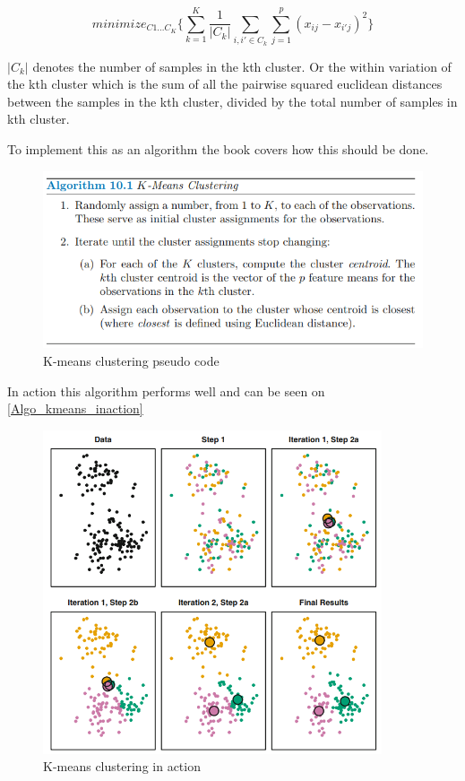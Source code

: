 \begin{equation} \label{transformed_linear_regression_eq}
minimize_{C1...C_{K}}\{\sum_{k=1}^{K}\dfrac{1}{\lvert C_{k} \rvert} \sum_{i,i'\in C_{k}}^{} \sum_{j=1}^{p}(x_{ij}-x_{i'j})^{2} \}
\end{equation}

$\lvert C_{k}\rvert$ denotes the number of samples in the kth cluster. Or the within variation of the kth cluster which is the sum of all the pairwise squared euclidean distances between the samples in the kth cluster, divided by the total number of samples in kth cluster.

To implement this as an algorithm the book \cite{book_2015} covers how this should be done. 

\begin{figure}[H]
	\centering
	\includegraphics[width=12cm]{Img/Algo_kmeans.PNG}
	\caption{K-means clustering pseudo code}
	\label{fig:k-Algo_kmeans}
\end{figure} 

In action this algorithm performs well and can be seen on \cref{Algo_kmeans_inaction}

\begin{figure}[H]
	\centering
	\includegraphics[width=10cm]{Img/Kmean_algo_example.PNG}
	\caption{K-means clustering in action}
	\label{fig:k-Algo_kmeans_inaction.PNG}
\end{figure} 


